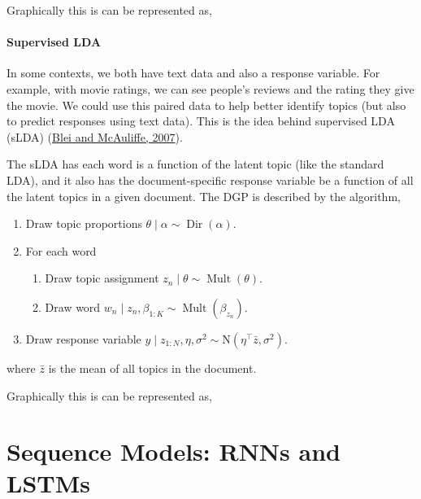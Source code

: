 \documentclass[
]{book}
\providecommand{\tightlist}{%
  \setlength{\itemsep}{0pt}\setlength{\parskip}{0pt}}
\begin{document}
Graphically this is can be represented as,

\hypertarget{supervised-lda}{%
\subsubsection{Supervised LDA}\label{supervised-lda}}

In some contexts, we both have text data and also a response variable. For example, with movie ratings, we can see people's reviews and the rating they give the movie. We could use this paired data to help better identify topics (but also to predict responses using text data). This is the idea behind supervised LDA (sLDA) (\href{https://proceedings.neurips.cc/paper/2007/file/d56b9fc4b0f1be8871f5e1c40c0067e7-Paper.pdf}{Blei and McAuliffe, 2007}).

The sLDA has each word is a function of the latent topic (like the standard LDA), and it also has the document-specific response variable be a function of all the latent topics in a given document. The DGP is described by the algorithm,

\begin{enumerate}
\def\labelenumi{\arabic{enumi}.}
\tightlist
\item
  Draw topic proportions \(\theta \mid \alpha \sim \operatorname{Dir}(\alpha)\).
\item
  For each word

  \begin{enumerate}
  \def\labelenumii{(\alph{enumii})}
  \tightlist
  \item
    Draw topic assignment \(z_{n} \mid \theta \sim \operatorname{Mult}(\theta)\).
  \item
    Draw word \(w_{n} \mid z_{n}, \beta_{1: K} \sim \operatorname{Mult}\left(\beta_{z_{n}}\right)\).
  \end{enumerate}
\item
  Draw response variable \(y \mid z_{1: N}, \eta, \sigma^{2} \sim \mathrm{N}\left(\eta^{\top} \bar{z}, \sigma^{2}\right)\).
\end{enumerate}

where \(\bar z\) is the mean of all topics in the document.

Graphically this is can be represented as,

\hypertarget{sequence-models-rnns-and-lstms}{%
\chapter{Sequence Models: RNNs and LSTMs}\label{sequence-models-rnns-and-lstms}}
\end{document}
